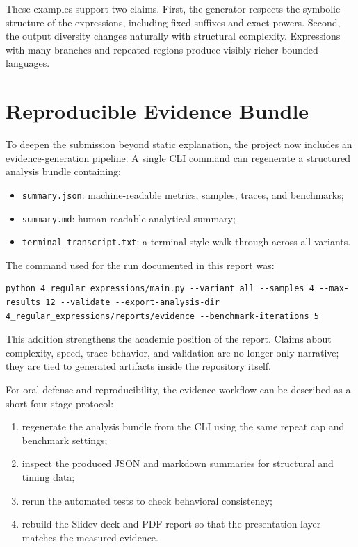 \documentclass[a4paper,12pt]{article}
\begin{document}
These examples support two claims. First, the generator respects the symbolic structure of the expressions, including fixed suffixes and exact powers. Second, the output diversity changes naturally with structural complexity. Expressions with many branches and repeated regions produce visibly richer bounded languages.

\section{Reproducible Evidence Bundle}

To deepen the submission beyond static explanation, the project now includes an evidence-generation pipeline. A single CLI command can regenerate a structured analysis bundle containing:

\begin{itemize}
    \item \texttt{summary.json}: machine-readable metrics, samples, traces, and benchmarks;
    \item \texttt{summary.md}: human-readable analytical summary;
    \item \texttt{terminal\_transcript.txt}: a terminal-style walk-through across all variants.
\end{itemize}

The command used for the run documented in this report was:

\begin{lstlisting}[style=labterminal,caption={Evidence bundle generation command used for this report.}]
python 4_regular_expressions/main.py --variant all --samples 4 --max-results 12 --validate --export-analysis-dir 4_regular_expressions/reports/evidence --benchmark-iterations 5
\end{lstlisting}

This addition strengthens the academic position of the report. Claims about complexity, speed, trace behavior, and validation are no longer only narrative; they are tied to generated artifacts inside the repository itself.

For oral defense and reproducibility, the evidence workflow can be described as a short four-stage protocol:

\begin{enumerate}[label=\arabic*.]
    \item regenerate the analysis bundle from the CLI using the same repeat cap and benchmark settings;
    \item inspect the produced JSON and markdown summaries for structural and timing data;
    \item rerun the automated tests to check behavioral consistency;
    \item rebuild the Slidev deck and PDF report so that the presentation layer matches the measured evidence.
\end{enumerate}
\end{document}
